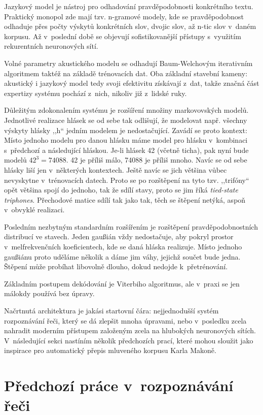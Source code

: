 Jazykový model je nástroj pro odhadování pravděpodobnosti konkrétního textu.
Praktický monopol zde mají tzv. n-gramové modely, kde se pravděpodobnost
odhaduje přes počty výskytů konkrétních slov, dvojic slov, až n-tic slov v~daném
korpusu. Až v~poslední době se objevují sofistikovanější přístupy s~využitím
rekurentních neuronových sítí.

Volné parametry akustického modelu se odhadují Baum-Welchovým iterativním
algoritmem taktéž na základě trénovacích dat. Oba základní stavební kameny:
akustický i jazykový model tedy svoji efektivitu získávají z~dat, takže značná
část expertizy systému pochází z~nich, nikoliv již z~lidské ruky.

Důležitým zdokonalením systému je rozšíření množiny markovovských modelů.
Jednotlivé realizace hlásek se od sebe tak odlišují, že modelovat např. všechny
výskyty hlásky ,,h`` jedním modelem je nedostačující. Zavádí se proto kontext:
Místo jednoho modelu pro danou hlásku máme model pro hlásku v~kombinaci
s~předchozí a následující hláskou. Je-li hlásek 42 (včetně ticha), pak nyní
bude modelů $42^3 = 74088$. 42 je příliš málo, 74088 je příliš mnoho. Navíc se
od sebe hlásky liší jen v~některých kontextech. Ještě navíc se jich většina
vůbec nevyskytne v~trénovacích datech. Proto se po rozštěpení na tyto tzv.
,,trifóny`` opět většina spojí do jednoho, tak že sdílí stavy, proto se jim říká
\textit{tied-state triphones}. Přechodové matice sdílí tak jako tak, těch se
štěpení netýká, aspoň v~obvyklé realizaci.

Posledním nezbytným standardním rozšířením je rozštěpení pravděpodobnostních
distribucí ve stavech. Jeden gaußián vždy nedostačuje, aby pokryl prostor
v~melfrekvenčních koeficientech, kde se daná hláska realizuje. Místo jednoho
gaußiánu proto uděláme několik a dáme jim váhy, jejichž součet bude jedna.
Štěpení může probíhat libovolně dlouho, dokud nedojde k~přetrénování.

Základním postupem dekódování je Viterbiho algoritmus, ale v~praxi se jen
málokdy používá bez úpravy.

Načrtnutá architektura je jakási startovní čára: nejjednodušší systém
rozpoznávání řeči, který se dá zlepšit mnoha úpravami, nebo v~posledku zcela
nahradit moderním přístupem založeným zcela na hlubokých neuronových sítích.
V~následující sekci nastíním několik předchozích prací, které mohou sloužit jako
inspirace pro automatický přepis mluveného korpusu Karla Makoně.

\section{Předchozí práce v~rozpoznávání řeči}

